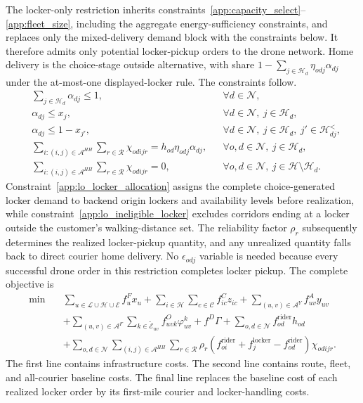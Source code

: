 \documentclass[final,3p,authoryear]{elsarticle}
\begin{document}
The locker-only restriction inherits constraints~\eqref{app:capacity_select}--\eqref{app:fleet_size}, including the aggregate energy-sufficiency constraints, and replaces only the mixed-delivery demand block with the constraints below.
It therefore admits only potential locker-pickup orders to the drone network.
Home delivery is the choice-stage outside alternative, with share $1-\sum_{j\in\mathcal H_d}\eta_{odj}\alpha_{dj}$ under the at-most-one displayed-locker rule.
The constraints follow.
\begin{align}
&
\sum_{j\in\mathcal H_d}\alpha_{dj}
\le1,
&&\forall d\in\mathcal N,
\label{app:lo_destination_limit}
\\
&
\alpha_{dj}\le x_j,
&&\forall d\in\mathcal N,\ j\in\mathcal H_d,
\label{app:lo_destination_open}
\\
&
\alpha_{dj}\le1-x_{j'},
&&\forall d\in\mathcal N,\ j\in\mathcal H_d,\ j'\in\mathcal H_{dj}^{<},
\label{app:lo_nearest_locker}
\\
&
\sum_{i:(i,j)\in\mathcal A^{HH}}
\sum_{r\in\mathcal R}
\chi_{odijr}
=h_{od}\eta_{odj}\alpha_{dj},
&&\forall o,d\in\mathcal N,\ j\in\mathcal H_d,
\label{app:lo_locker_allocation}
\\
&
\sum_{i:(i,j)\in\mathcal A^{HH}}
\sum_{r\in\mathcal R}
\chi_{odijr}
=0,
&&\forall o,d\in\mathcal N,\ j\in\mathcal H\setminus\mathcal H_d.
\label{app:lo_ineligible_locker}
\end{align}
Constraint~\eqref{app:lo_locker_allocation} assigns the complete choice-generated locker demand to backend origin lockers and availability levels before realization, while constraint~\eqref{app:lo_ineligible_locker} excludes corridors ending at a locker outside the customer's walking-distance set.
The reliability factor $\rho_r$ subsequently determines the realized locker-pickup quantity, and any unrealized quantity falls back to direct courier home delivery.
No $\epsilon_{odj}$ variable is needed because every successful drone order in this restriction completes locker pickup.
The complete objective is
\begin{align}
\min\quad
&
\sum_{u\in\mathcal L\cup\mathcal H\cup\mathcal E}f_u^{F}x_u
+
\sum_{i\in\mathcal H}\sum_{c\in\mathcal C}f_{ic}^{C}z_{ic}
+
\sum_{(u,v)\in\mathcal A^{Y}}f_{uv}^{A}y_{uv}
\nonumber\\
&+
\sum_{(u,v)\in\mathcal A^{F}}
\sum_{k\in\widetilde{\mathcal E}_{uv}}
f_{uvk}^{O}\varphi_{uv}^{k}
+f^{D}\Gamma
+
\sum_{o,d\in\mathcal N}f_{od}^{\mathrm{rider}}h_{od}
\nonumber\\
&+
\sum_{o,d\in\mathcal N}
\sum_{(i,j)\in\mathcal A^{HH}}
\sum_{r\in\mathcal R}
\rho_r
\left(
f_{oi}^{\mathrm{rider}}
+f_j^{\mathrm{locker}}
-f_{od}^{\mathrm{rider}}
\right)
\chi_{odijr}.
\label{app:lo_objective}
\end{align}
The first line contains infrastructure costs.
The second line contains route, fleet, and all-courier baseline costs.
The final line replaces the baseline cost of each realized locker order by its first-mile courier and locker-handling costs.

\endgroup
\end{document}
